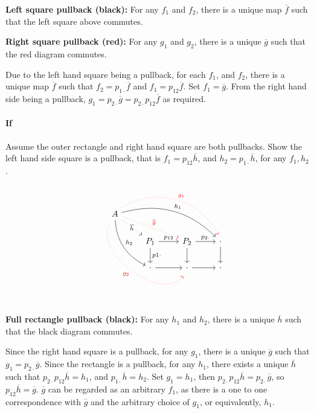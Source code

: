 \documentclass{article}
\begin{document}
\textbf{Left square pullback (black):} For any $f_1$ and $f_2$, there is a unique map $\overline{f}$ such that the left square above commutes.

\textbf{Right square pullback (red):}  For any $g_1$ and $g_2$, there is a unique $\overline{g}$ such that the red diagram commutes.

Due to the left hand square being a pullback, for each $f_1$, and $f_2$, there is a unique map $\overline{f}$ such that $f_2 = p_{1\cdot}\overline{f}$ and $f_1 = p_{12}\overline{f}$. Set $f_1 = \overline{g}$.   From the right hand side being a pullback,  $g_1 = p_{2\cdot}\overline{g}=p_{2\cdot}p_{12}\overline{f}$ as required.

\paragraph{If}

Assume the outer rectangle and right hand square are both pullbacks. Show the left hand side square is a pullback, that is $f_1 = p_{12}\overline{h}$, and $h_2=p_{1\cdot}\overline{h}$, for any $f_1,  h_2$.

\begin{equation*}
\begin{tikzcd}
A
\arrow[drrr, bend left, "h_1"]
\arrow[drr, "\overline{g}", yshift=0.2ex, dotted, red]
\arrow[ddr, bend right, "h_2"]
\arrow[dr, dotted, "\overline{h}" description]
\arrow[drrr, bend left=50, dotted, red, yshift=0.5ex, "g_1"]
\arrow[ddrr, bend right=90, dotted, red, yshift=-0.8ex, "g_2"'] & & \\
& P_1 \arrow[r, "p_{12}"] \arrow[d, "p{1\cdot}"] & P_2 \arrow[r, "p_{2\cdot}"] \arrow[d, ""]
& \cdot \arrow[d, ""] \\
& \cdot \arrow[r, ""] & \cdot \arrow[r, ""]
& \cdot
\end{tikzcd}
\end{equation*}

\textbf{Full rectangle pullback (black):}  For any $h_1$ and $h_2$, there is a unique $\overline{h}$ such that the black diagram commutes.

Since the right hand square is a pullback, for any $g_1$, there is a unique $\overline{g}$ such that $g_1 = p_{2\cdot}\overline{g}$. Since the rectangle is a pullback, for any $h_1$, there exists a unique $\overline{h}$ such that $p_{2\cdot}p_{12}\overline{h} = h_1$, and $p_{1\cdot}\overline{h} = h_2$. Set $g_1=h_1$, then $p_{2\cdot}p_{12}\overline{h} = p_{2\cdot}\overline{g}$, so $p_{12}\overline{h} = \overline{g}$. $\overline{g}$ can be regarded as an arbitrary $f_1$, as there is a one to one correspondence with $\overline{g}$ and the arbitrary choice of $g_1$, or equivalently, $h_1$.
\end{document}
